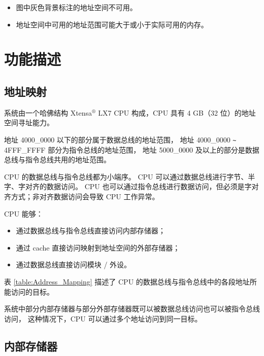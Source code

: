 \documentclass[main\_\_CN.tex]{subfiles}
\begin{document}
\begin{tiplisting}
\vspace{-2em}
\begin{itemize}
    \item 图中灰色背景标注的地址空间不可用。
    \item 地址空间中可用的地址范围可能大于或小于实际可用的内存。
\end{itemize}

\end{tiplisting}

\section{功能描述}

\subsection{地址映射}

系统由一个哈佛结构 Xtensa$^®$ LX7 CPU 构成，CPU 具有 4 GB（32 位）的地址空间寻址能力。

地址 \hexprefix{}4000\_0000 以下的部分属于数据总线的地址范围，
地址 \hexprefix{}4000\_0000 \verb+~+ \hexprefix{}4FFF\_FFFF 部分为指令总线的地址范围，
地址 \hexprefix{}5000\_0000 及以上的部分是数据总线与指令总线共用的地址范围。

CPU 的数据总线与指令总线都为小端序。
CPU 可以通过数据总线进行字节、半字、字对齐的数据访问。
CPU 也可以通过指令总线进行数据访问，但必须是字对齐方式；非对齐数据访问会导致 CPU 工作异常。

CPU 能够：
\begin{itemize}
\item 通过数据总线与指令总线直接访问内部存储器；
\item 通过 cache 直接访问映射到地址空间的外部存储器；
\item 通过数据总线直接访问模块 / 外设。
\end{itemize}
表 \ref{table:Address_Mapping} 描述了 CPU 的数据总线与指令总线中的各段地址所能访问的目标。

系统中部分内部存储器与部分外部存储器既可以被数据总线访问也可以被指令总线访问，
这种情况下，CPU 可以通过多个地址访问到同一目标。



\subsection{内部存储器}\label{para:embedded memory}
\end{document}
